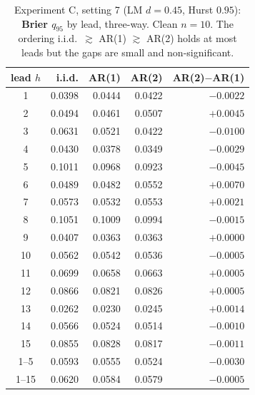 \documentclass[11pt]{article}
\begin{document}
\begin{table}[ht]
\centering
\caption{Experiment C, setting 7 (LM $d = 0.45$, Hurst $0.95$): \textbf{Brier
$q_{95}$} by lead, three-way. Clean $n = 10$. The ordering
i.i.d.\ $\gtrsim$ AR(1) $\gtrsim$ AR(2) holds at most leads but the gaps are
small and non-significant.}
\label{tab:expC7brier}
\small
\begin{tabular}{crrrr}
\toprule
lead $h$ & i.i.d. & AR(1) & AR(2) & AR(2)$-$AR(1) \\
\midrule
1 & 0.0398 & 0.0444 & 0.0422 & $-0.0022$ \\
2 & 0.0494 & 0.0461 & 0.0507 & $+0.0045$ \\
3 & 0.0631 & 0.0521 & 0.0422 & $-0.0100$ \\
4 & 0.0430 & 0.0378 & 0.0349 & $-0.0029$ \\
5 & 0.1011 & 0.0968 & 0.0923 & $-0.0045$ \\
6 & 0.0489 & 0.0482 & 0.0552 & $+0.0070$ \\
7 & 0.0573 & 0.0532 & 0.0553 & $+0.0021$ \\
8 & 0.1051 & 0.1009 & 0.0994 & $-0.0015$ \\
9 & 0.0407 & 0.0363 & 0.0363 & $+0.0000$ \\
10 & 0.0562 & 0.0542 & 0.0536 & $-0.0005$ \\
11 & 0.0699 & 0.0658 & 0.0663 & $+0.0005$ \\
12 & 0.0866 & 0.0821 & 0.0826 & $+0.0005$ \\
13 & 0.0262 & 0.0230 & 0.0245 & $+0.0014$ \\
14 & 0.0566 & 0.0524 & 0.0514 & $-0.0010$ \\
15 & 0.0855 & 0.0828 & 0.0817 & $-0.0011$ \\
\midrule
1--5 & 0.0593 & 0.0555 & 0.0524 & $-0.0030$ \\
1--15 & 0.0620 & 0.0584 & 0.0579 & $-0.0005$ \\
\bottomrule
\end{tabular}
\end{table}
\end{document}
